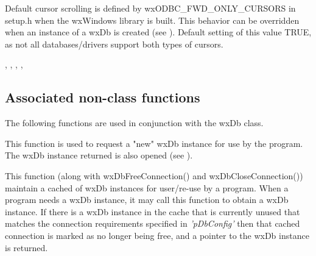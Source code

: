 



Default cursor scrolling is defined by wxODBC_FWD_ONLY_CURSORS in setup.h
when the wxWindows library is built.  This behavior can be overridden when 
an instance of a wxDb is created (see ).  
Default setting of this value TRUE, as not all databases/drivers support 
both types of cursors.


, , 
, , 

\subsection{Associated non-class functions}\label{wxdbfunctions}

The following functions are used in conjunction with the wxDb class.




This function is used to request a "new" wxDb instance for use by the program. 
The wxDb instance returned is also opened (see ).  

This function (along with wxDbFreeConnection() and wxDbCloseConnection()) 
maintain a cached of wxDb instances for user/re-use by a program.  When a 
program needs a wxDb instance, it may call this function to obtain a wxDb 
instance.  If there is a wxDb instance in the cache that is currently unused 
that matches the connection requirements specified in {\it'pDbConfig'} then 
that cached connection is marked as no longer being free, and a pointer to 
the wxDb instance is returned.

